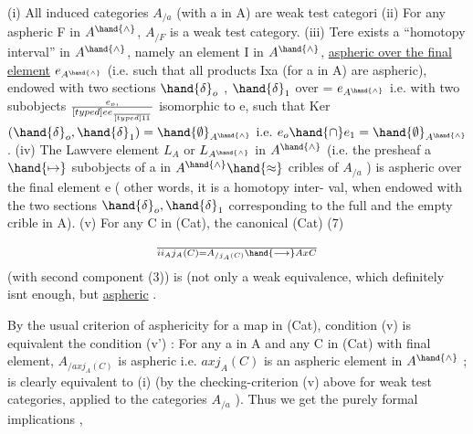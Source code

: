 (i)  All induced categories $A_{/a}$  (with a in A) are weak test categori
(ii)  For any aspheric F in $A^{\hand{\wedge}}$, $A_{/F}$ is a weak test category.
(iii)  Tere exists a  ``homotopy interval'' in $A^{\hand{\wedge}}$,  namely an element
 I in $A^{\hand{\wedge}}$, \uline{aspheric over the final element} $e_{A^{\hand{\wedge}}}$ (i.e. such that
all products Ixa (for a in A) are  aspheric),  endowed with
two sections $\hand{\delta}_o$  , $\hand{\delta}_1$ over  = $e_{A^{\hand{\wedge}}}$ i.e. with two subobjects
$e_o,\over[typed]{e}{e}_{\over[typed]{1}{1}}$   isomorphic to e,  such that  Ker$(\hand{\delta}_o,\hand{\delta}_1) = \hand{\emptyset}_{A^{\hand{\wedge}}}$
i.e. $e_o\hand{\cap}e_1 = \hand{\emptyset}_{A^{\hand{\wedge}}}$.
(iv)  The Lawvere element $L_A$ or $L_{A^{\hand{\wedge}}}$ in $A^{\hand{\wedge}}$ (i.e. the  presheaf
a $\hand{\mapsto}$ subobjects of a in $A^{\hand{\wedge}} \hand{\approx}$ cribles of $A_{/a}$ )  is aspheric over
the final element e  (\hand{\unsure{,}} other words, it is a homotopy inter-%
val,  when endowed with the two sections $\hand{\delta}_o,\hand{\delta}_1$  corresponding
to the  full and the empty crible in A).
(v)  For any  C in (Cat),  the canonical   (Cat)
(7) \[ \over{i}{i}_A j_A(C) = A_{/j_A(C)} \hand{\longrightarrow} AxC \]
(with second component (3))  is (not only a weak equivalence,
which definitely isnt enough,  but \hand{)} \uline{aspheric} .

By the usual criterion of asphericity for a map in (Cat),  condition
(v)  is equivalent   the condition  (v') :  For any a in A and any C
in (Cat) with final element,  $A_{/axj_A(C)}$  is aspheric i.e.  $axj_A(C)$  is an
aspheric element in $A^{\hand{\wedge}}$ ;    is clearly equivalent to (i)  (by the
checking-criterion (v) above for weak test categories,  applied to the
categories $A_{/a}$ ). Thus we get the purely formal implications
\deleted{\unsure{,}} ,

